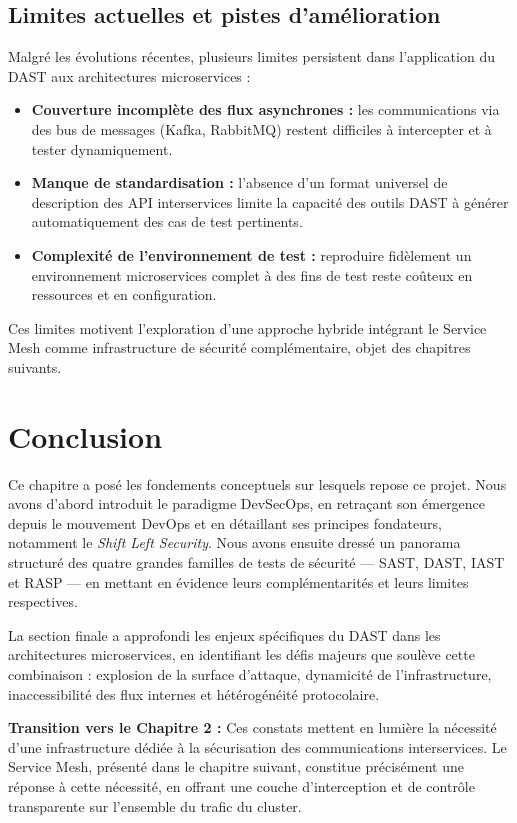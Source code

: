 \subsection{Limites actuelles et pistes d'amélioration}

Malgré les évolutions récentes, plusieurs limites persistent dans l'application
du DAST aux architectures microservices :

\begin{itemize}
  \item \textbf{Couverture incomplète des flux asynchrones :} les communications
    via des bus de messages (Kafka, RabbitMQ) restent difficiles à intercepter
    et à tester dynamiquement.
  \item \textbf{Manque de standardisation :} l'absence d'un format universel de
    description des API interservices limite la capacité des outils DAST à
    générer automatiquement des cas de test pertinents.
  \item \textbf{Complexité de l'environnement de test :} reproduire fidèlement
    un environnement microservices complet à des fins de test reste coûteux
    en ressources et en configuration.
\end{itemize}

Ces limites motivent l'exploration d'une approche hybride intégrant le Service Mesh
comme infrastructure de sécurité complémentaire, objet des chapitres suivants.

\section{Conclusion}

Ce chapitre a posé les fondements conceptuels sur lesquels repose ce projet.
Nous avons d'abord introduit le paradigme DevSecOps, en retraçant son émergence
depuis le mouvement DevOps et en détaillant ses principes fondateurs, notamment
le \textit{Shift Left Security}. Nous avons ensuite dressé un panorama structuré
des quatre grandes familles de tests de sécurité --- SAST, DAST, IAST et RASP ---
en mettant en évidence leurs complémentarités et leurs limites respectives.

La section finale a approfondi les enjeux spécifiques du DAST dans les
architectures microservices, en identifiant les défis majeurs que soulève
cette combinaison : explosion de la surface d'attaque, dynamicité de
l'infrastructure, inaccessibilité des flux internes et hétérogénéité protocolaire.

\begin{tcolorbox}[
  colback=gray!8, colframe=darkgray,
  leftrule=4pt, toprule=0.4pt, bottomrule=0.4pt, rightrule=0.4pt,
  arc=2pt
]
  \textbf{Transition vers le Chapitre 2 :} Ces constats mettent en lumière la
  nécessité d'une infrastructure dédiée à la sécurisation des communications
  interservices. Le Service Mesh, présenté dans le chapitre suivant, constitue
  précisément une réponse à cette nécessité, en offrant une couche d'interception
  et de contrôle transparente sur l'ensemble du trafic du cluster.
\end{tcolorbox}
